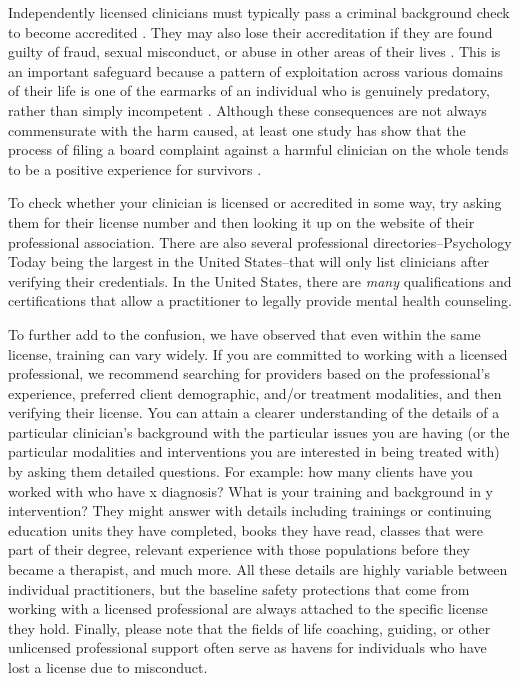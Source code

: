\documentclass[12pt,letterpaper]{book}
\begin{document}
Independently licensed clinicians must typically pass a criminal background check to become accredited \cite{dunlap2021background}. They may also lose their accreditation if they are found guilty of fraud, sexual misconduct, or abuse in other areas of their lives \cite{barsky2023licensing}. This is an important safeguard because a pattern of exploitation across various domains of their life is one of the earmarks of an individual who is genuinely predatory, rather than simply incompetent \cite{cooke2001refining}. Although these consequences are not always commensurate with the harm caused, at least one study has show that the process of filing a board complaint against a harmful clinician on the whole tends to be a positive experience for survivors \cite{vinson1987complaintProcedures}.

To check whether your clinician is licensed or accredited in some way, try asking them for their license number and then looking it up on the website of their professional association. There are also several professional directories–Psychology Today being the largest in the United States–that will only list clinicians after verifying their credentials. In the United States, there are \textit{many} qualifications and certifications that allow a practitioner to legally provide mental health counseling. 

To further add to the confusion, we have observed that even within the same license, training can vary widely. If you are committed to working with a licensed professional, we recommend searching for providers based on the professional's experience, preferred client demographic, and/or treatment modalities, and then verifying their license. You can attain a clearer understanding of the details of a particular clinician's background with the particular issues you are having (or the particular modalities and interventions you are interested in being treated with) by asking them detailed questions. For example: how many clients have you worked with who have x diagnosis? What is your training and background in y intervention? They might answer with details including trainings or continuing education units they have completed, books they have read, classes that were part of their degree, relevant experience with those populations before they became a therapist, and much more. All these details are highly variable between individual practitioners, but the baseline safety protections that come from working with a licensed professional are always attached to the specific license they hold. Finally, please note that the fields of life coaching, guiding, or other unlicensed professional support often serve as havens for individuals who have lost a license due to misconduct. 
\end{document}
